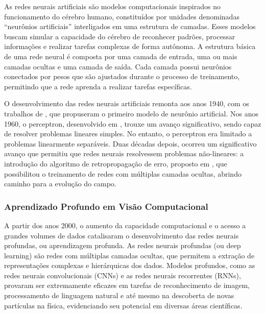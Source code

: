 As redes neurais artificiais são modelos computacionais inspirados no funcionamento do cérebro humano, constituídos por unidades denominadas ``neurônios artificiais'' interligados em uma estrutura de camadas. Esses modelos buscam simular a capacidade do cérebro de reconhecer padrões, processar informações e realizar tarefas complexas de forma autônoma. A estrutura básica de uma rede neural é composta por uma camada de entrada, uma ou mais camadas ocultas e uma camada de saída. Cada camada possui neurônios conectados por pesos que são ajustados durante o processo de treinamento, permitindo que a rede aprenda a realizar tarefas específicas.

O desenvolvimento das redes neurais artificiais remonta aos anos 1940, com os trabalhos de \citet{neuronio}, que propuseram o primeiro modelo de neurônio artificial. Nos anos 1960, o perceptron, desenvolvido em \citet{perceptron}, trouxe um avanço significativo, sendo capaz de resolver problemas lineares simples. No entanto, o perceptron era limitado a problemas linearmente separáveis. Duas décadas depois, ocorreu um significativo avanço que permitiu que redes neurais resolvessem problemas não-lineares: a introdução do algoritmo de retropropagação de erro, proposto em \citet{backprop}, que possibilitou o treinamento de redes com múltiplas camadas ocultas, abrindo caminho para a evolução do campo.


\subsubsection{Aprendizado Profundo em Visão Computacional}
\label{sec:dl-cv}
A partir dos anos 2000, o aumento da capacidade computacional e o acesso a grandes volumes de dados catalisaram o desenvolvimento das redes neurais profundas, ou aprendizagem profunda. As redes neurais profundas (ou deep learning) são redes com múltiplas camadas ocultas, que permitem a extração de representações complexas e hierárquicas dos dados. Modelos profundos, como as redes neurais convolucionais (CNNs) e as redes neurais recorrentes (RNNs), provaram ser extremamente eficazes em tarefas de reconhecimento de imagem, processamento de linguagem natural e até mesmo na descoberta de novas partículas na física, evidenciando seu potencial em diversas áreas científicas.

